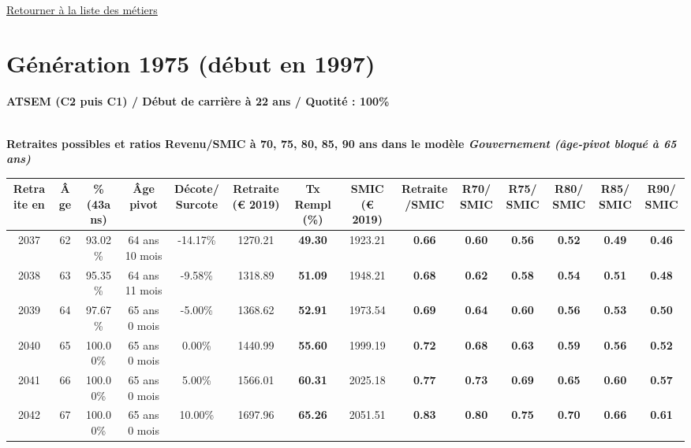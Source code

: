~\\ 
 
 \hyperlink{page.2}{\noindent Retourner à la liste des métiers}

 \newpage 

\section{Génération 1975 (début en 1997)\label{ATSEM_100_1975_22_0}} 
 
{\bf \noindent ATSEM (C2 puis C1) / Début de carrière à 22 ans / Quotité : 100\%}  ~ 

 ~\\{\bf \noindent Retraites possibles et ratios Revenu/SMIC à 70, 75, 80, 85, 90 ans dans le modèle \emph{Gouvernement (âge-pivot bloqué à 65 ans)}}  
 
\begin{adjustbox}{max width=\textwidth} 
\begin{tabular}[htb]{|c|c||c|c|c||c|c||c|c||c|c|c|c|c|} 
\hline 
 Retraite en &  Âge &  \%(43ans) &  Âge pivot &  Décote/Surcote &  Retraite (\euro{} 2019) &  Tx Rempl(\%) &  SMIC (\euro{} 2019) &  Retraite/SMIC &  R70/SMIC &  R75/SMIC &  R80/SMIC &  R85/SMIC &  R90/SMIC \\ 
\hline \hline 
 2037 &  62 &  93.02\% &  64 ans 10 mois &  -14.17\% &  1270.21 &  {\bf 49.30} &  1923.21 &  {\bf {\color{red} 0.66}} &  {\bf {\color{red} 0.60}} &  {\bf {\color{red} 0.56}} &  {\bf {\color{red} 0.52}} &  {\bf {\color{red} 0.49}} &  {\bf {\color{red} 0.46}} \\ 
\hline 
 2038 &  63 &  95.35\% &  64 ans 11 mois &  -9.58\% &  1318.89 &  {\bf 51.09} &  1948.21 &  {\bf {\color{red} 0.68}} &  {\bf {\color{red} 0.62}} &  {\bf {\color{red} 0.58}} &  {\bf {\color{red} 0.54}} &  {\bf {\color{red} 0.51}} &  {\bf {\color{red} 0.48}} \\ 
\hline 
 2039 &  64 &  97.67\% &  65 ans 0 mois &  -5.00\% &  1368.62 &  {\bf 52.91} &  1973.54 &  {\bf {\color{red} 0.69}} &  {\bf {\color{red} 0.64}} &  {\bf {\color{red} 0.60}} &  {\bf {\color{red} 0.56}} &  {\bf {\color{red} 0.53}} &  {\bf {\color{red} 0.50}} \\ 
\hline 
 2040 &  65 &  100.00\% &  65 ans 0 mois &  0.00\% &  1440.99 &  {\bf 55.60} &  1999.19 &  {\bf {\color{red} 0.72}} &  {\bf {\color{red} 0.68}} &  {\bf {\color{red} 0.63}} &  {\bf {\color{red} 0.59}} &  {\bf {\color{red} 0.56}} &  {\bf {\color{red} 0.52}} \\ 
\hline 
 2041 &  66 &  100.00\% &  65 ans 0 mois &  5.00\% &  1566.01 &  {\bf 60.31} &  2025.18 &  {\bf {\color{red} 0.77}} &  {\bf {\color{red} 0.73}} &  {\bf {\color{red} 0.69}} &  {\bf {\color{red} 0.65}} &  {\bf {\color{red} 0.60}} &  {\bf {\color{red} 0.57}} \\ 
\hline 
 2042 &  67 &  100.00\% &  65 ans 0 mois &  10.00\% &  1697.96 &  {\bf 65.26} &  2051.51 &  {\bf {\color{red} 0.83}} &  {\bf {\color{red} 0.80}} &  {\bf {\color{red} 0.75}} &  {\bf {\color{red} 0.70}} &  {\bf {\color{red} 0.66}} &  {\bf {\color{red} 0.61}} \\ 
\hline 
\hline 
\end{tabular} 
\end{adjustbox} 
 
